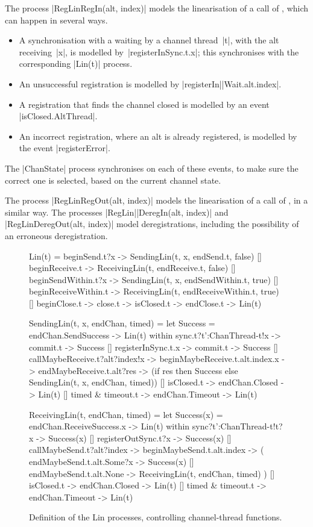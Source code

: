 The process |RegLinRegIn(alt, index)| models the linearisation of a call of
, which can happen in several ways.
%
\begin{itemize}
\item A synchronisation with a waiting  by a channel thread~|t|,
  with the alt receiving~|x|, is modelled by~|registerInSync.t.x|;
  this synchronises with the corresponding |Lin(t)| process.

\item An unsuccessful registration is modelled by
  |registerIn|\-|Wait.alt.index|.

\item A registration that finds the channel closed is modelled by an event
  |isClosed.AltThread|.

\item An incorrect registration, where an alt is already registered, is
  modelled by the event |registerError|.
\end{itemize}
% 
The |ChanState| process synchronises on each of these events, to make sure the
correct one is selected, based on the current channel state. 

The process |RegLinRegOut(alt, index)| models the linearisation of a call of
, in a similar way.  The processes
|RegLin|\-|DeregIn(alt, index)| and |RegLinDeregOut(alt, index)| model
deregistrations, including the possibility of an erroneous deregistration.


\begin{figure}
\begin{cspm}
Lin(t) = 
  beginSend.t?x -> SendingLin(t, x, endSend.t, false)
  [] beginReceive.t -> ReceivingLin(t, endReceive.t, false)
  [] beginSendWithin.t?x -> SendingLin(t, x, endSendWithin.t, true)
  [] beginReceiveWithin.t -> ReceivingLin(t, endReceiveWithin.t, true) 
  [] beginClose.t -> close.t -> isClosed.t -> endClose.t -> Lin(t)
  
SendingLin(t, x, endChan, timed) = 
  let Success = endChan.SendSuccess -> Lin(t) within
  sync.t?t':ChanThread-{t}!x -> commit.t -> Success
  [] registerInSync.t.x -> commit.t -> Success
  [] callMaybeReceive.t?alt?index!x -> beginMaybeReceive.t.alt.index.x -> 
    endMaybeReceive.t.alt?res -> 
    (if res then Success else SendingLin(t, x, endChan, timed))
  [] isClosed.t -> endChan.Closed -> Lin(t)
  [] timed & timeout.t -> endChan.Timeout -> Lin(t)
  
ReceivingLin(t, endChan, timed) =  
  let Success(x) = endChan.ReceiveSuccess.x -> Lin(t) within
  sync?t':ChanThread-{t}!t?x -> Success(x) 
  [] registerOutSync.t?x -> Success(x) 
  [] callMaybeSend.t?alt?index -> beginMaybeSend.t.alt.index -> (
    endMaybeSend.t.alt.Some?x -> Success(x) 
    [] endMaybeSend.t.alt.None -> ReceivingLin(t, endChan, timed) )
  [] isClosed.t -> endChan.Closed -> Lin(t)
  [] timed & timeout.t -> endChan.Timeout -> Lin(t)
\end{cspm}
\caption{Definition of the {\scalashape Lin} processes, controlling
  channel-thread functions.  \label{fig:Lin}}
\end{figure}

